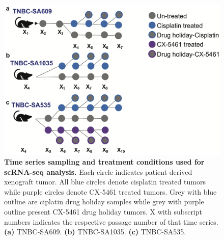 \begin{figure}
\centering
\includegraphics[width=\textwidth]{Figures/chap5/SchematicsforRNAsampling.png}
	
\caption[SchematicsforRNAsampling]
	{\small
	\textbf{Time series sampling and treatment conditions used for scRNA-seq analysis.}
	Each circle indicates patient derived xenograft tumor. All blue circles denote cisplatin treated tumors while purple circles denote CX-5461 treated tumors. Grey with blue outline are ciplatin drug holiday samples while grey with purple outline present CX-5461 drug holiday tumors. X with subscript numbers indicates the respective passage number of that time series. 
	   \textbf{(a)} TNBC-SA609.
	    \textbf{(b)} TNBC-SA1035.
	    \textbf{(c)} TNBC-SA535.
	}
	\label{fig:RNAsampletree}
\end{figure}


